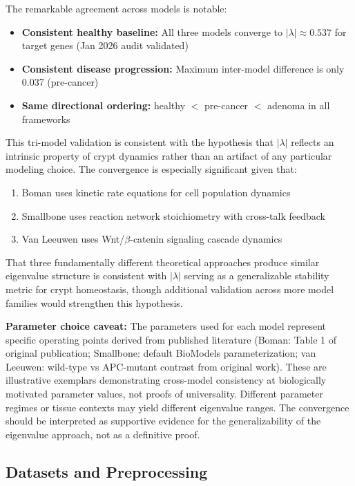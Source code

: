 \documentclass[11pt,a4paper]{article}
\begin{document}
The remarkable agreement across models is notable:
\begin{itemize}
    \item \textbf{Consistent healthy baseline:} All three models converge to $|\lambda| \approx 0.537$ for target genes (Jan 2026 audit validated)
    \item \textbf{Consistent disease progression:} Maximum inter-model difference is only 0.037 (pre-cancer)
    \item \textbf{Same directional ordering:} healthy $<$ pre-cancer $<$ adenoma in all frameworks
\end{itemize}

This tri-model validation is consistent with the hypothesis that $|\lambda|$ reflects an intrinsic property of crypt dynamics rather than an artifact of any particular modeling choice. The convergence is especially significant given that:
\begin{enumerate}
    \item Boman uses kinetic rate equations for cell population dynamics
    \item Smallbone uses reaction network stoichiometry with cross-talk feedback
    \item Van Leeuwen uses Wnt/$\beta$-catenin signaling cascade dynamics
\end{enumerate}

That three fundamentally different theoretical approaches produce similar eigenvalue structure is consistent with $|\lambda|$ serving as a generalizable stability metric for crypt homeostasis, though additional validation across more model families would strengthen this hypothesis.

\textbf{Parameter choice caveat:} The parameters used for each model represent specific operating points derived from published literature (Boman: Table 1 of original publication; Smallbone: default BioModels parameterization; van Leeuwen: wild-type vs APC-mutant contrast from original work). These are illustrative exemplars demonstrating cross-model consistency at biologically motivated parameter values, not proofs of universality. Different parameter regimes or tissue contexts may yield different eigenvalue ranges. The convergence should be interpreted as supportive evidence for the generalizability of the eigenvalue approach, not as a definitive proof.

\subsection{Datasets and Preprocessing}
\end{document}
